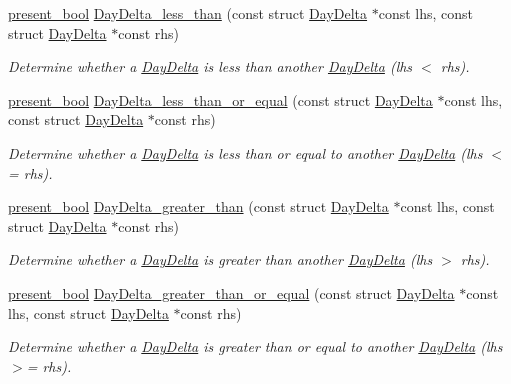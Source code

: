 \begin{DoxyCompactItemize}
\hyperlink{types_8h_a1c24e2cdd988b886e889080ded176ae0}{present\-\_\-bool} \hyperlink{day-delta_8h_a47b5981aba0ded3368ade32fcf77e1fb}{Day\-Delta\-\_\-less\-\_\-than} (const struct \hyperlink{structDayDelta}{Day\-Delta} $\ast$const lhs, const struct \hyperlink{structDayDelta}{Day\-Delta} $\ast$const rhs)
\begin{DoxyCompactList}\small\item\em Determine whether a \hyperlink{structDayDelta}{Day\-Delta} is less than another \hyperlink{structDayDelta}{Day\-Delta} (lhs $<$ rhs). \end{DoxyCompactList}\item 
\hyperlink{types_8h_a1c24e2cdd988b886e889080ded176ae0}{present\-\_\-bool} \hyperlink{day-delta_8h_ad8c2d0d57be8633a7c47eaf7d5d018b0}{Day\-Delta\-\_\-less\-\_\-than\-\_\-or\-\_\-equal} (const struct \hyperlink{structDayDelta}{Day\-Delta} $\ast$const lhs, const struct \hyperlink{structDayDelta}{Day\-Delta} $\ast$const rhs)
\begin{DoxyCompactList}\small\item\em Determine whether a \hyperlink{structDayDelta}{Day\-Delta} is less than or equal to another \hyperlink{structDayDelta}{Day\-Delta} (lhs $<$= rhs). \end{DoxyCompactList}\item 
\hyperlink{types_8h_a1c24e2cdd988b886e889080ded176ae0}{present\-\_\-bool} \hyperlink{day-delta_8h_a3be314820557dbfce261dce0cfec5f6d}{Day\-Delta\-\_\-greater\-\_\-than} (const struct \hyperlink{structDayDelta}{Day\-Delta} $\ast$const lhs, const struct \hyperlink{structDayDelta}{Day\-Delta} $\ast$const rhs)
\begin{DoxyCompactList}\small\item\em Determine whether a \hyperlink{structDayDelta}{Day\-Delta} is greater than another \hyperlink{structDayDelta}{Day\-Delta} (lhs $>$ rhs). \end{DoxyCompactList}\item 
\hyperlink{types_8h_a1c24e2cdd988b886e889080ded176ae0}{present\-\_\-bool} \hyperlink{day-delta_8h_aa9e880711e48d109025c051544d630d4}{Day\-Delta\-\_\-greater\-\_\-than\-\_\-or\-\_\-equal} (const struct \hyperlink{structDayDelta}{Day\-Delta} $\ast$const lhs, const struct \hyperlink{structDayDelta}{Day\-Delta} $\ast$const rhs)
\begin{DoxyCompactList}\small\item\em Determine whether a \hyperlink{structDayDelta}{Day\-Delta} is greater than or equal to another \hyperlink{structDayDelta}{Day\-Delta} (lhs $>$= rhs). \end{DoxyCompactList}\end{DoxyCompactItemize}



